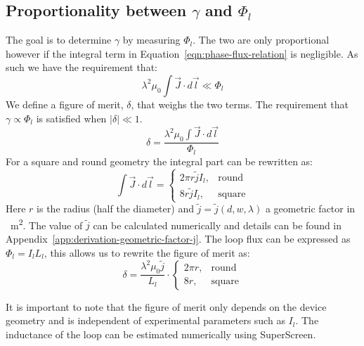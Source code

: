 \subsection{Proportionality between $\gamma$ and $\Phi_l$}
\label{sec:figure-of-merit}
The goal is to determine $\gamma$ by measuring $\Phi_l$. The two are only proportional however if the integral term in Equation~\ref{eqn:phase-flux-relation} is negligible. As such we have the requirement that:
\begin{equation*}
	\lambda^2\mu_0 \int \vec{J}\cdot d \vec{l} \ll \Phi_l
\end{equation*}
We define a figure of merit, $\delta$, that weighs the two terms. The requirement that $\gamma \propto \Phi_l$ is satisfied when $|\delta| \ll 1$.
\begin{equation}
	\delta = \frac{\lambda^2\mu_0 \int \vec{J}\cdot d \vec{l}}{\Phi_l}
\end{equation}
For a square and round geometry the integral part can be rewritten as:
\begin{equation}
	\int \vec{J}\cdot d \vec{l} = \begin{cases}
		2\pi r \tilde{j} I_l, &\text{round} \\
		8r \tilde{j} I_l, &\text{square}
	\end{cases}
\end{equation}
Here $r$ is the radius (half the diameter) and $\tilde{j} = \tilde{j}(d, w, \lambda)$ a geometric factor in \unit{\per\square\meter}. The value of $\tilde{j}$ can be calculated numerically and details can be found in Appendix~\ref{app:derivation-geometric-factor-j}. The loop flux can be expressed as $\Phi_l = I_lL_l$, this allows us to rewrite the figure of merit as:
\begin{equation}
	\delta = \frac{\lambda^2\mu_0\tilde{j}}{L_l} \cdot \begin{cases}
		2\pi r, &\text{round} \\
		8r, &\text{square}
	\end{cases}
	\label{eqn:figure-of-merit}
\end{equation}

It is important to note that the figure of merit only depends on the device geometry and is independent of experimental parameters such as $I_l$. The inductance of the loop can be estimated numerically using SuperScreen.\cite{bishop-vanhornSuperScreenOpensourcePackage2022}

